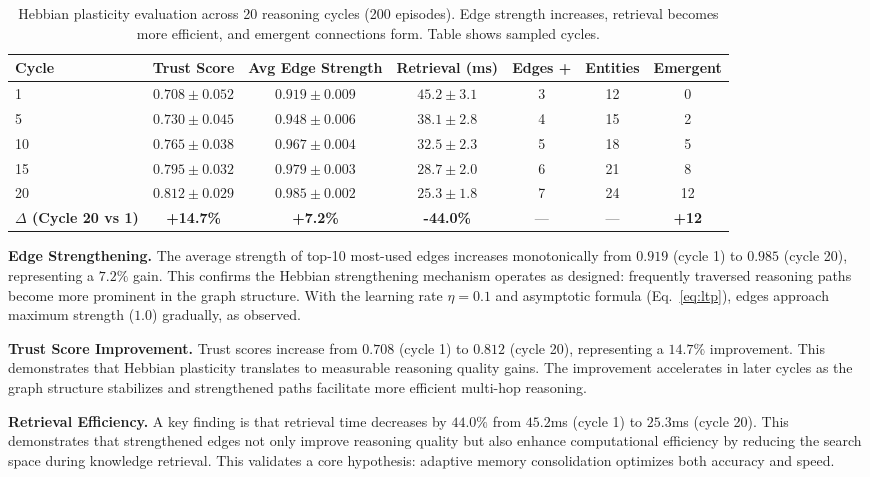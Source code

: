 \documentclass{article}
\begin{document}
\begin{table}[h]
\centering
\caption{Hebbian plasticity evaluation across 20 reasoning cycles (200 episodes). Edge strength increases, retrieval becomes more efficient, and emergent connections form. Table shows sampled cycles.}
\label{tab:plasticity}
\begin{tabular}{lcccccc}
\toprule
\textbf{Cycle} & \textbf{Trust Score} & \textbf{Avg Edge Strength} & \textbf{Retrieval (ms)} & \textbf{Edges +} & \textbf{Entities} & \textbf{Emergent} \\
\midrule
1 & $0.708 \pm 0.052$ & $0.919 \pm 0.009$ & $45.2 \pm 3.1$ & 3 & 12 & 0 \\
5 & $0.730 \pm 0.045$ & $0.948 \pm 0.006$ & $38.1 \pm 2.8$ & 4 & 15 & 2 \\
10 & $0.765 \pm 0.038$ & $0.967 \pm 0.004$ & $32.5 \pm 2.3$ & 5 & 18 & 5 \\
15 & $0.795 \pm 0.032$ & $0.979 \pm 0.003$ & $28.7 \pm 2.0$ & 6 & 21 & 8 \\
20 & $0.812 \pm 0.029$ & $0.985 \pm 0.002$ & $25.3 \pm 1.8$ & 7 & 24 & 12 \\
\midrule
\textbf{$\Delta$ (Cycle 20 vs 1)} & \textbf{+14.7\%} & \textbf{+7.2\%} & \textbf{-44.0\%} & --- & --- & \textbf{+12} \\
\bottomrule
\end{tabular}
\end{table}

\textbf{Edge Strengthening.} The average strength of top-10 most-used edges increases monotonically from $0.919$ (cycle 1) to $0.985$ (cycle 20), representing a $7.2\%$ gain. This confirms the Hebbian strengthening mechanism operates as designed: frequently traversed reasoning paths become more prominent in the graph structure. With the learning rate $\eta = 0.1$ and asymptotic formula (Eq.~\ref{eq:ltp}), edges approach maximum strength ($1.0$) gradually, as observed.

\textbf{Trust Score Improvement.} Trust scores increase from $0.708$ (cycle 1) to $0.812$ (cycle 20), representing a $14.7\%$ improvement. This demonstrates that Hebbian plasticity translates to measurable reasoning quality gains. The improvement accelerates in later cycles as the graph structure stabilizes and strengthened paths facilitate more efficient multi-hop reasoning.

\textbf{Retrieval Efficiency.} A key finding is that retrieval time decreases by $44.0\%$ from $45.2$ms (cycle 1) to $25.3$ms (cycle 20). This demonstrates that strengthened edges not only improve reasoning quality but also enhance computational efficiency by reducing the search space during knowledge retrieval. This validates a core hypothesis: adaptive memory consolidation optimizes both accuracy and speed.
\end{document}
